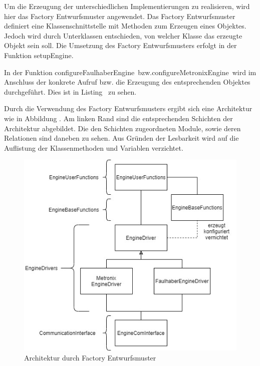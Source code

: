 Um die Erzeugung der unterschiedlichen Implementierungen zu realisieren, wird hier das Factory Entwurfsmuster angewendet. Das Factory Entwurfsmuster definiert eine Klassenschnittstelle mit Methoden zum Erzeugen eines Objektes. Jedoch wird durch Unterklassen entschieden, von welcher Klasse das erzeugte Objekt sein soll.\cite{Gamma.2008}
Die Umsetzung des Factory Entwurfsmusters erfolgt in der Funktion \dq setupEngine\dq.
\begin{center}

\begin{minipage}[h]{\textwidth}
	
\end{minipage}
\end{center}
In der Funktion \dq configureFaulhaberEngine\dq~bzw.\dq configureMetronixEngine\dq~wird im Anschluss der konkrete Aufruf bzw. die Erzeugung des entsprechenden Objektes durchgeführt. Dies ist in Listing \dq {}\dq~zu sehen.
\begin{center}

\begin{minipage}[h]{\textwidth}
	
\end{minipage}
\end{center}
\newpage
Durch die Verwendung des Factory Entwurfsmusters ergibt sich eine Architektur wie in Abbildung \dq {}\dq. Am linken Rand sind die entsprechenden Schichten der Architektur abgebildet. Die den Schichten zugeordneten Module, sowie deren Relationen sind daneben zu sehen. Aus Gründen der Lesbarkeit wird auf die Auflistung der Klassenmethoden und Variablen verzichtet.
\begin{figure}[h]
	\centering
  \includegraphics[width=1\textwidth]{img/ArchitekturFactory.jpg} 
   \caption{Architektur durch Factory Entwurfsmuster}
  \label{fig:ArchitekturFactory.jpg}
\end{figure}

 